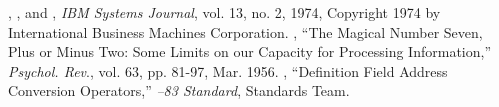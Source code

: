 \begin{references}{9}
 , ,
and ,
\emph{ IBM Systems Journal}, vol. 13, no. 2, 1974, Copyright 1974 by
International Business Machines Corporation.
 , ``The Magical Number Seven, Plus or
Minus Two: Some Limits on our Capacity for Processing Information,''
\emph{Psychol. Rev}., vol. 63, pp. 81-97, Mar. 1956.
 , ``Definition Field Address
Conversion Operators,'' \emph{\Forth{}--83 Standard}, \Forth{} Standards
Team.
\end{references}
